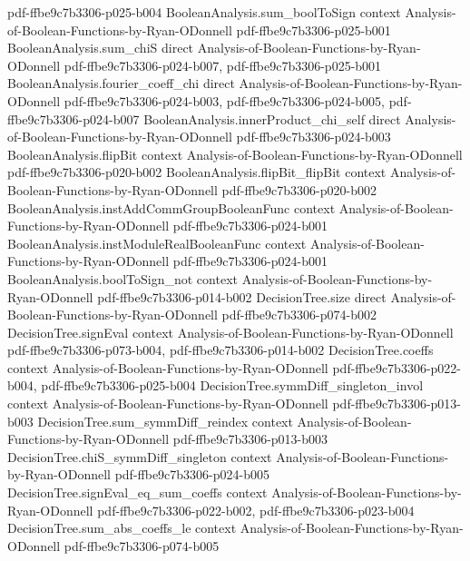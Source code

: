 \begin{theorem}
  {pdf-ffbe9c7b3306-p025-b004}
\proofstep
  {BooleanAnalysis.sum_boolToSign}
  {context}
  {Analysis-of-Boolean-Functions-by-Ryan-ODonnell}
  {pdf-ffbe9c7b3306-p025-b001}
\proofstep
  {BooleanAnalysis.sum_chiS}
  {direct}
  {Analysis-of-Boolean-Functions-by-Ryan-ODonnell}
  {pdf-ffbe9c7b3306-p024-b007,
    pdf-ffbe9c7b3306-p025-b001}
\proofstep
  {BooleanAnalysis.fourier_coeff_chi}
  {direct}
  {Analysis-of-Boolean-Functions-by-Ryan-ODonnell}
  {pdf-ffbe9c7b3306-p024-b003,
    pdf-ffbe9c7b3306-p024-b005,
    pdf-ffbe9c7b3306-p024-b007}
\proofstep
  {BooleanAnalysis.innerProduct_chi_self}
  {direct}
  {Analysis-of-Boolean-Functions-by-Ryan-ODonnell}
  {pdf-ffbe9c7b3306-p024-b003}
\proofstep
  {BooleanAnalysis.flipBit}
  {context}
  {Analysis-of-Boolean-Functions-by-Ryan-ODonnell}
  {pdf-ffbe9c7b3306-p020-b002}
\proofstep
  {BooleanAnalysis.flipBit_flipBit}
  {context}
  {Analysis-of-Boolean-Functions-by-Ryan-ODonnell}
  {pdf-ffbe9c7b3306-p020-b002}
\proofstep
  {BooleanAnalysis.instAddCommGroupBooleanFunc}
  {context}
  {Analysis-of-Boolean-Functions-by-Ryan-ODonnell}
  {pdf-ffbe9c7b3306-p024-b001}
\proofstep
  {BooleanAnalysis.instModuleRealBooleanFunc}
  {context}
  {Analysis-of-Boolean-Functions-by-Ryan-ODonnell}
  {pdf-ffbe9c7b3306-p024-b001}
\proofstep
  {BooleanAnalysis.boolToSign_not}
  {context}
  {Analysis-of-Boolean-Functions-by-Ryan-ODonnell}
  {pdf-ffbe9c7b3306-p014-b002}
\proofstep
  {DecisionTree.size}
  {direct}
  {Analysis-of-Boolean-Functions-by-Ryan-ODonnell}
  {pdf-ffbe9c7b3306-p074-b002}
\proofstep
  {DecisionTree.signEval}
  {context}
  {Analysis-of-Boolean-Functions-by-Ryan-ODonnell}
  {pdf-ffbe9c7b3306-p073-b004,
    pdf-ffbe9c7b3306-p014-b002}
\proofstep
  {DecisionTree.coeffs}
  {context}
  {Analysis-of-Boolean-Functions-by-Ryan-ODonnell}
  {pdf-ffbe9c7b3306-p022-b004,
    pdf-ffbe9c7b3306-p025-b004}
\proofstep
  {DecisionTree.symmDiff_singleton_invol}
  {context}
  {Analysis-of-Boolean-Functions-by-Ryan-ODonnell}
  {pdf-ffbe9c7b3306-p013-b003}
\proofstep
  {DecisionTree.sum_symmDiff_reindex}
  {context}
  {Analysis-of-Boolean-Functions-by-Ryan-ODonnell}
  {pdf-ffbe9c7b3306-p013-b003}
\proofstep
  {DecisionTree.chiS_symmDiff_singleton}
  {context}
  {Analysis-of-Boolean-Functions-by-Ryan-ODonnell}
  {pdf-ffbe9c7b3306-p024-b005}
\proofstep
  {DecisionTree.signEval_eq_sum_coeffs}
  {context}
  {Analysis-of-Boolean-Functions-by-Ryan-ODonnell}
  {pdf-ffbe9c7b3306-p022-b002,
    pdf-ffbe9c7b3306-p023-b004}
\proofstep
  {DecisionTree.sum_abs_coeffs_le}
  {context}
  {Analysis-of-Boolean-Functions-by-Ryan-ODonnell}
  {pdf-ffbe9c7b3306-p074-b005}

\end{theorem}
